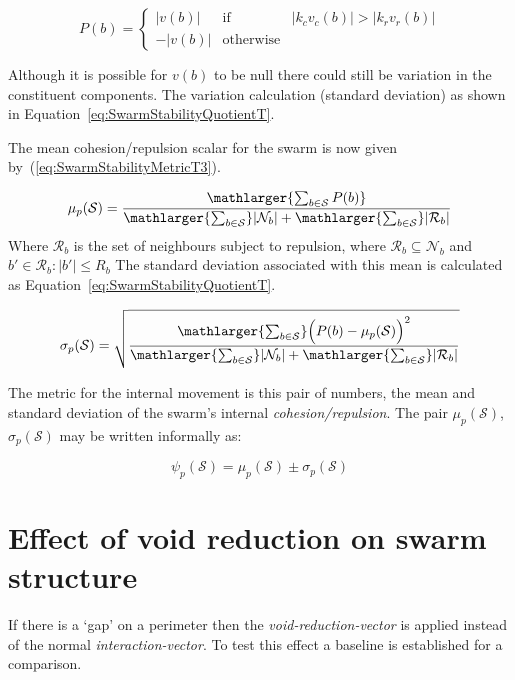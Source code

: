 \documentclass[preprint,12pt]{elsarticle}
\newcommand{\magn}[1]{\vert{#1}\vert}
\begin{document}
\begin{equation}
\label{eq:CohesionRepulsion}
P(b) = \left\{\begin{array}{lll}
               |v(b)|& \mathrm{if} & |k_c v_c(b)| > |k_r v_r(b)|\\
              -|v(b)|& \mathrm{otherwise}
              \end{array}\right.
\end{equation}

Although it is possible for $v(b)$ to be null there could still be variation in the constituent components. The variation calculation (standard deviation) as shown in Equation~\ref{eq:SwarmStabilityQuotientT}. 

The mean cohesion/repulsion scalar for the swarm is now given by~(\ref{eq:SwarmStabilityMetricT3}).  

\begin{equation}
\label{eq:SwarmStabilityMetricT3}
\mu_p(\mathcal S) = \frac{\mathlarger{\sum_{b \in \mathcal S} P(b)}}{\mathlarger{\sum_{b \in \mathcal S}}|\mathcal{N}_b| + \mathlarger{\sum_{b \in \mathcal S}}|\mathcal R_b|}
\end{equation}
Where $\mathcal R_b$ is the set of neighbours subject to repulsion, 
where $\mathcal R_b \subseteq \mathcal N_b$ and $b'\in\mathcal R_b:\magn{b'}\leq R_b$
The standard deviation associated with this mean is calculated as Equation~\ref{eq:SwarmStabilityQuotientT}.

\begin{equation}
\label{eq:SwarmStabilityQuotientT}
\sigma_p(\mathcal S) = \sqrt{\frac{\mathlarger{\sum_{b \in \mathcal S}}\Big(P(b)-\mu_p(\mathcal S)\Big)^2}{\mathlarger{\sum_{b \in \mathcal S}}|\mathcal{N}_b| + \mathlarger{\sum_{b \in \mathcal S}}|\mathcal R_b|}}
\end{equation}

The metric for the internal movement is this pair of numbers, the mean and standard deviation of the swarm's internal \textit{cohesion/repulsion}. The pair $\mu_p(\mathcal S)$, $\sigma_p(\mathcal S)$ may be written informally as: 

\begin{equation}
\label{eq:SwarmPotentialMagnitude}
\psi_p(\mathcal S) = \mu_p(\mathcal S)\pm \sigma_p(\mathcal S)
\end{equation}

\section{Effect of void reduction on swarm structure}
If there is a `gap' on a perimeter then the \textit{void-reduction-vector} is applied instead of the normal \textit{interaction-vector}. To test this effect a baseline is established for a comparison.
\end{document}
